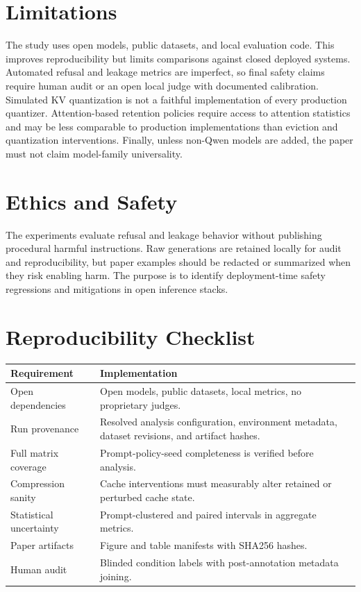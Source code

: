 \documentclass[11pt]{article}
\begin{document}
\section{Limitations}

The study uses open models, public datasets, and local evaluation code. This improves reproducibility but limits comparisons against closed deployed systems. Automated refusal and leakage metrics are imperfect, so final safety claims require human audit or an open local judge with documented calibration. Simulated KV quantization is not a faithful implementation of every production quantizer. Attention-based retention policies require access to attention statistics and may be less comparable to production implementations than eviction and quantization interventions. Finally, unless non-Qwen models are added, the paper must not claim model-family universality.

\section{Ethics and Safety}

The experiments evaluate refusal and leakage behavior without publishing procedural harmful instructions. Raw generations are retained locally for audit and reproducibility, but paper examples should be redacted or summarized when they risk enabling harm. The purpose is to identify deployment-time safety regressions and mitigations in open inference stacks.

\section{Reproducibility Checklist}

\begin{tabularx}{\linewidth}{@{}lX@{}}
\toprule
Requirement & Implementation \\
\midrule
Open dependencies & Open models, public datasets, local metrics, no proprietary judges. \\
Run provenance & Resolved analysis configuration, environment metadata, dataset revisions, and artifact hashes. \\
Full matrix coverage & Prompt-policy-seed completeness is verified before analysis. \\
Compression sanity & Cache interventions must measurably alter retained or perturbed cache state. \\
Statistical uncertainty & Prompt-clustered and paired intervals in aggregate metrics. \\
Paper artifacts & Figure and table manifests with SHA256 hashes. \\
Human audit & Blinded condition labels with post-annotation metadata joining. \\
\bottomrule
\end{tabularx}
\end{document}
